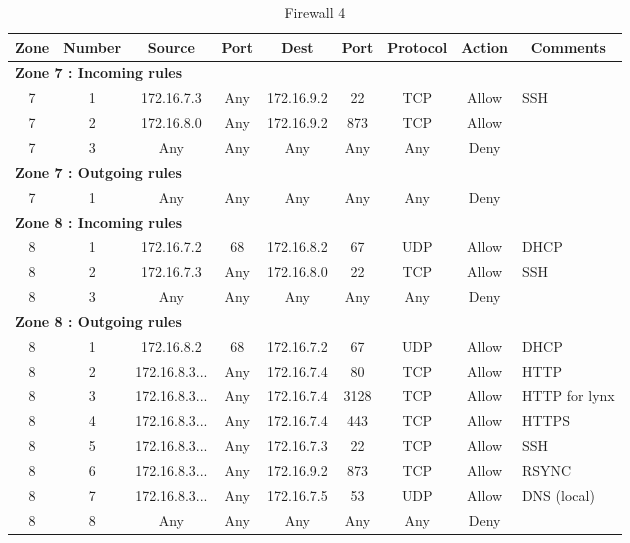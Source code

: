 \documentclass[a4paper,titlepage]{article}
\begin{document}
\begin{table}[h]
	\center
	\begin{tabular}{c|c|cc|cc|ccl}
		Zone & Number & Source & Port & Dest & Port & Protocol & Action & \multicolumn{1}{c}{Comments}\\
		\hline
		\multicolumn{9}{l}{\textbf{Zone 7 : Incoming rules}}\\
		7 & 1 & 172.16.7.3 & Any & 172.16.9.2 & 22 & TCP & Allow & SSH\\
		7 & 2 & 172.16.8.0 & Any & 172.16.9.2 & 873 & TCP & Allow & \\
		7 & 3 & Any & Any & Any & Any & Any & Deny & \\
		\hline
		\multicolumn{9}{l}{\textbf{Zone 7 : Outgoing rules}}\\
		7 & 1 & Any & Any & Any & Any & Any & Deny & \\

		\hline
		\multicolumn{9}{l}{\textbf{Zone 8 : Incoming rules}}\\
		8 & 1 & 172.16.7.2 & 68 &  172.16.8.2 & 67 & UDP & Allow & DHCP\\
		8 & 2 & 172.16.7.3 & Any & 172.16.8.0 & 22 & TCP & Allow & SSH \\
		8 & 3 & Any & Any & Any & Any & Any & Deny & \\
		\hline
		\multicolumn{9}{l}{\textbf{Zone 8 : Outgoing rules}}\\
		8 & 1 & 172.16.8.2 & 68 & 172.16.7.2 & 67 & UDP & Allow & DHCP\\
		8 & 2 & 172.16.8.3... & Any & 172.16.7.4 & 80 & TCP & Allow & HTTP \\
		8 & 3 & 172.16.8.3... & Any & 172.16.7.4 & 3128 & TCP & Allow & HTTP for lynx\\
		8 & 4 & 172.16.8.3... & Any & 172.16.7.4 & 443 & TCP & Allow & HTTPS \\
		8 & 5 & 172.16.8.3... & Any & 172.16.7.3 & 22 & TCP & Allow & SSH \\
		8 & 6 & 172.16.8.3... & Any & 172.16.9.2 & 873 & TCP & Allow & RSYNC \\
		8 & 7 & 172.16.8.3... & Any & 172.16.7.5 & 53 & UDP & Allow & DNS (local) \\
		8 & 8 & Any & Any & Any & Any & Any & Deny & \\
		\hline

	\end{tabular}
	\caption{Firewall 4}
\end{table}
\end{document}
